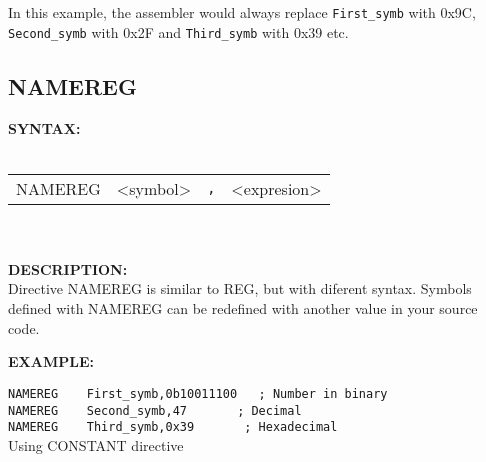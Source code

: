             In this example, the assembler would always replace {\color{highlight_symbol}\verb'First_symb'} with 0x9C,
            {\color{highlight_symbol}\verb'Second_symb'} with 0x2F and {\color{highlight_symbol}\verb'Third_symb'} with 0x39 etc.

                \subsection{NAMEREG}
                \textbf{SYNTAX:}\\
                    \\ {
                        \texttt{}
                        \begin{tabular}[h!]{llll}
                                { \color{highlight_directive} NAMEREG } &
                                { \color{highlight_symbol} <symbol> }  &
                                \verb',' &
                                { \color{highlight_constant} <expresion> }\\
                        \end{tabular}
                    }\\
                    \\
                \textbf{DESCRIPTION:}\\
                Directive NAMEREG is similar to REG, but with diferent syntax. Symbols defined with NAMEREG can be redefined with another value in your source
                code.

                \textbf{EXAMPLE:}\\
                \begin{code}[h!]
                                {\color{highlight_directive}\verb'NAMEREG'}\verb'    '{\color{highlight_symbol}\verb'First_symb'}\verb','{\color{highlight_constant}\verb'0b10011100'}\verb'   '{\color{highlight_comment}\verb'; Number in binary'}\\
                                {\color{highlight_directive}\verb'NAMEREG'}\verb'    '{\color{highlight_symbol}\verb'Second_symb'}\verb','{\color{highlight_constant}\verb'47'}\verb'       '{\color{highlight_comment}\verb'; Decimal'}\\
                                {\color{highlight_directive}\verb'NAMEREG'}\verb'    '{\color{highlight_symbol}\verb'Third_symb'}\verb','{\color{highlight_constant}\verb'0x39'}\verb'       '{\color{highlight_comment}\verb'; Hexadecimal'}\\
                        \caption{Using CONSTANT directive}
                    \end{code}

